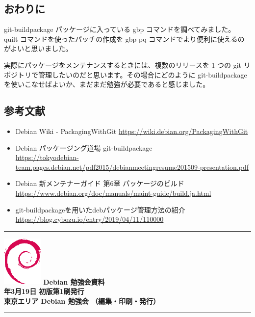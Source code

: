 \documentclass[mingoth,a4paper]{jsarticle}
\newcommand{\debmtgyear}{2022}
\newcommand{\debmtgmonth}{3}
\newcommand{\debmtgdate}{19}
\begin{document}
\subsection{おわりに}

git-buildpackage パッケージに入っている gbp コマンドを調べてみました。
quilt コマンドを使ったパッチの作成を gbp pq コマンドでより便利に使えるのがよいと思いました。

実際にパッケージをメンテナンスするときには、複数のリリースを 1 つの git リポジトリで管理したいのだと思います。その場合にどのように git-buildpackage を使いこなせばよいか、まだまだ勉強が必要であると感じました。


\subsection{参考文献}

\begin{itemize}
  \item Debian Wiki - PackagingWithGit \url{https://wiki.debian.org/PackagingWithGit}
  \item Debian パッケージング道場 git-buildpackage\\ \url{https://tokyodebian-team.pages.debian.net/pdf2015/debianmeetingresume201509-presentation.pdf}
  \item Debian 新メンテナーガイド 第6章 パッケージのビルド \\ \url{https://www.debian.org/doc/manuals/maint-guide/build.ja.html}
  \item git-buildpackageを用いたdebパッケージ管理方法の紹介 \\ \url{https://blog.cybozu.io/entry/2019/04/11/110000}
\end{itemize}


\newpage


\vspace*{15cm}
\hrule
\vspace{2mm}
\includegraphics[width=2cm]{image-assets/openlogo-nd.eps}
\noindent \Large \bf Debian 勉強会資料\\
\noindent \normalfont \debmtgyear{}年\debmtgmonth{}月\debmtgdate{}日 \hspace{5mm}  初版第1刷発行\\
\noindent \normalfont 東京エリア Debian 勉強会 （編集・印刷・発行）\\
\hrule
\end{document}
